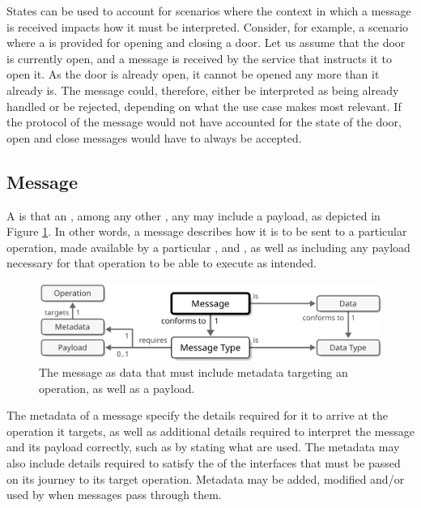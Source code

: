 States can be used to account for scenarios where the context in which a message is received impacts how it must be interpreted.
Consider, for example, a scenario where a  is provided for opening and closing a door.
Let us assume that the door is currently open, and a message is received by the service that instructs it to open it.
As the door is already open, it cannot be opened any more than it already is.
The message could, therefore, either be interpreted as being already handled or be rejected, depending on what the use case makes most relevant.
If the protocol of the message would not have accounted for the state of the door, open and close messages would have to always be accepted.

\subsection{Message}
\label{sec:concepts:message}

A  is  that  an , among any other , any may include a payload, as depicted in Figure \ref{fig:message}.
In other words, a message describes how it is to be sent to a particular operation, made available by a particular ,  and , as well as including any payload necessary for that operation to be able to execute as intended.

\vfill

\begin{figure}[ht!]
  \centering
  \includegraphics[scale=0.9]{figures/message}
  \caption{
    The message as data that must include metadata targeting an operation, as well as a payload.
  }
  \label{fig:message}
\end{figure}

\vfill

The metadata of a message specify the details required for it to arrive at the operation it targets, as well as additional details required to interpret the message and its payload correctly, such as by stating what  are used.
The metadata may also include details required to satisfy the  of the interfaces that must be passed on its journey to its target operation.
Metadata may be added, modified and/or used by  when messages pass through them.


